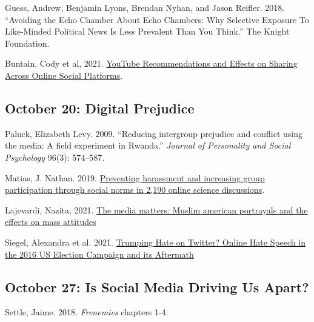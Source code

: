 \vspace{-.1in}\documentclass[11pt]{article}
\begin{document}
\noindent Guess, Andrew, Benjamin Lyons, Brendan Nyhan, and Jason Reifler. 2018. ``Avoiding the Echo Chamber About Echo Chambers: Why Selective Exposure To Like-Minded Political News Is Less Prevalent Than You Think.'' The Knight Foundation.


\noindent Buntain, Cody et al, 2021. \href{https://dl.acm.org/doi/10.1145/3449085}{YouTube Recommendations and Effects on Sharing Across Online Social Platforms}.
	




\subsection*{October 20: Digital Prejudice }

Paluck, Elizabeth Levy. 2009. ``Reducing intergroup prejudice and conflict using the media: A field experiment in Rwanda.'' \emph{Journal of Personality and Social Psychology} 96(3): 574--587.

\noindent Matias, J. Nathan. 2019. \href{https://www.pnas.org/content/pnas/116/20/9785.full.pdf}{Preventing harassment and increasing group participation through social norms in 2,190 online	science discussions}.

\noindent Lajevardi, Nazita, 2021. \href{https://www.journals.uchicago.edu/doi/full/10.1086/711300?casa_token=wITxV2WJeaQAAAAA:1wco3QZFwUnMq6EOzYON4LXw2XZUU-By0eeehfQq8QuDzgcUuQW93THNT8o7USkGF81ypdGHcHA}{The media matters: Muslim american portrayals and the effects on mass attitudes}

\noindent Siegel, Alexandra et al. 2021. \href{https://alexandra-siegel.com/wp-content/uploads/2019/08/qjps_election_hatespeech_RR.pdf}{Trumping Hate on Twitter? Online Hate Speech in the 2016 US Election Campaign and its Aftermath}






\subsection*{October 27: Is Social Media Driving Us Apart?}

\noindent Settle, Jaime. 2018. {\it Frenemies} chapters 1-4.
\end{document}
